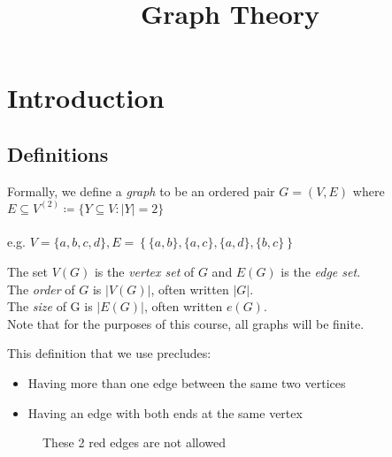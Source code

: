 \documentclass[10pt,a4paper]{article}
\title{Graph Theory}
\begin{document}
\maketitle
\section{Introduction}
\subsection*{Definitions}
Formally, we define a \emph{graph} to be an ordered pair $G = (V, E)$ where $E \subseteq V^{(2)} \coloneqq \{ Y \subseteq V : |Y| = 2\}$\\\\
e.g. $V = \{a,b,c,d\}, E = \left\{\{a,b\},\{a,c\},\{a,d\},\{b,c\}\right\}$\\
\begin{center}
\end{center}
The set \emph{$V(G)$} is the \emph{vertex set} of $G$ and \emph{$E(G)$} is the \emph{edge set}.\\
The \emph{order} of $G$ is $|V(G)|$, often written $|G|$.\\
The \emph{size} of G is $|E(G)|$, often written $e(G)$.\\
Note that for the purposes of this course, all graphs will be finite.

This definition that we use precludes:
\begin{itemize}
\item Having more than one edge between the same two vertices
\item Having an edge with both ends at the same vertex
\end{itemize}
\begin{figure}[h]
\begin{center}
\end{center}
\caption*{These 2 red edges are not allowed}
\end{figure}
\end{document}

